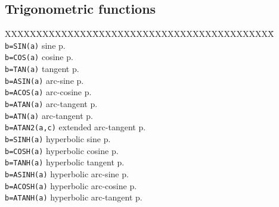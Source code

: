 \subsection{Trigonometric functions}
\begin{tabbing}
XXXXXXXXXXXXXX\=XXXXXXXXXXXXXXXXXXXXXXXXXXXXX\=\kill\\
\verb|b=SIN(a)|	\>     sine\> p.\pageref{SIN}\\
\verb|b=COS(a)|	\>     cosine\> p.\pageref{COS}\\
\verb|b=TAN(a)|	\>     tangent\> p.\pageref{TAN}\\

\verb|b=ASIN(a)|	\>arc-sine \> p.\pageref{ASIN}\\
\verb|b=ACOS(a)|	\>arc-cosine \> p.\pageref{ACOS}\\
\verb|b=ATAN(a)|	\>arc-tangent \> p.\pageref{ATAN}\\
\verb|b=ATN(a)|	\>arc-tangent \> p.\pageref{ATN}\\
\verb|b=ATAN2(a,c)|	\>extended arc-tangent \> p.\pageref{ATAN2}\\

\verb|b=SINH(a)|	\>hyperbolic sine \> p.\pageref{SINH}\\
\verb|b=COSH(a)|	\>hyperbolic cosine\> p.\pageref{COSH}\\
\verb|b=TANH(a)|	\>hyperbolic tangent\> p.\pageref{TANH}\\

\verb|b=ASINH(a)|	\>hyperbolic arc-sine\> p.\pageref{ASINH}\\
\verb|b=ACOSH(a)|	\>hyperbolic arc-cosine\> p.\pageref{ACOSH}\\
\verb|b=ATANH(a)|	\>hyperbolic arc-tangent\> p.\pageref{ATANH}\\
\end{tabbing}

